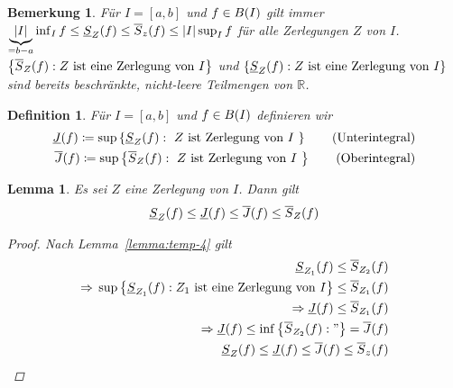 \documentclass[11pt, twoside, a4paper]{article}
\theoremstyle{plain}
\newtheorem{bemerkung}[blockelement]{Bemerkung}
\newtheorem{definition}[blockelement]{Definition}
\newtheorem{lemma}[blockelement]{Lemma}
\newcommand{\set}[1]{\left\{#1\right\}}
\newcommand{\of}[1]{\mathopen{}\mathclose{}\bgroup\left(#1\aftergroup\egroup\right)}
\newcommand{\abs}[1]{\left\lvert#1\right\rvert}
\newcommand{\interv}[1]{\left[#1\right]}
\newcommand{\impl}[0]{\Rightarrow{}}
\newcommand{\definedas}[0]{\coloneqq}
\newcommand{\R}{\mathbb{R}}
\begin{document}
    \begin{bemerkung}
        Für $I=\interv{a,b}$ und $f\in B\of{I}$ gilt immer $\underbrace{\abs{I}}_{=b-a} \inf_{I} f \leq \underline{S}_Z\of{f} \leq \overline{S}_z\of{f} \leq \abs{I} \sup_{I} f$ für alle Zerlegungen $Z$ von $I$.\\
        $\set{\overline{S}_Z\of{f} : Z \text{ ist eine Zerlegung von } I}$ und $\set{\underline{S}_Z\of{f} : Z \text{ ist eine Zerlegung von } I}$ sind bereits beschränkte, nicht-leere Teilmengen von $\R$.
    \end{bemerkung}

    \begin{definition}
        Für $I=\interv{a,b}$ und $f\in B\of{I}$ definieren wir
        \begin{align*}
            \underline{J}\of{f} \definedas \sup\set{\underline{S}_Z\of{f} : \text{ $Z$ ist Zerlegung von $I$ } }\tag{Unterintegral}\\
            \overline{J}\of{f} \definedas \sup\set{\overline{S}_Z\of{f} : \text{ $Z$ ist Zerlegung von $I$ } }\tag{Oberintegral}\\
        \end{align*}
    \end{definition}

    \begin{lemma} %
        Es sei $Z$ eine Zerlegung von $I$. Dann gilt
        \begin{align*}
            \underline{S}_{Z}\of{f} \leq \underline{J}\of{f} \leq \overline{J}\of{f} \leq \overline{S}_{Z}\of{f}
        \end{align*}
        \begin{proof}
            Nach Lemma~\ref{lemma:temp-4} gilt
            \begin{align*}
                \underline{S}_{Z_1}\of{f} \leq \overline{S}_{Z_2}\of{f}\\
                \impl \sup\set{\underline{S}_{Z_1}\of{f}: Z_1 \text{ ist eine Zerlegung von } I} \leq \overline{S}_{Z_1}\of{f}\\
                \impl \underline{J}\of{f} \leq \overline{S}_{Z_1}\of{f}\\
                \impl \underline{J}\of{f} \leq \inf\set{\overline{S}_{Z_2}\of{f}: "} = \overline{J}\of{f}\\
                \underline{S}_{Z}\of{f} \leq \underline{J}\of{f}\leq \overline{J}\of{f} \leq \overline{S}_z\of{f}
            \end{align*}
        \end{proof}
    \end{lemma}
\end{document}
